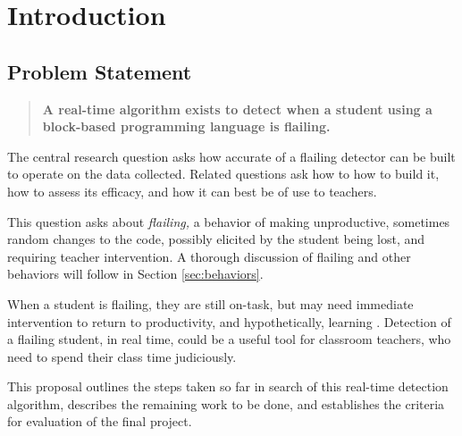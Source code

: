 \chapter{Introduction}

 
\section{Problem Statement} \label{sec:problem-statement}
\begin{quote}
\textbf{A real-time algorithm exists to detect when a student using a block-based programming language is flailing.}
\end{quote}

The central research question asks how accurate of a flailing detector can be built to operate on the data collected. Related questions ask how to how to build it, how to assess its efficacy, and how it can best be of use to teachers.

This question asks about \emph{flailing,} a behavior of making unproductive, sometimes random changes to the code, possibly elicited by the student being lost, and requiring teacher intervention. A thorough discussion of flailing and other behaviors will follow in Section \ref{sec:behaviors}.

When a student is flailing, they are still on-task, but may need immediate intervention to return to productivity, and hypothetically, learning \citep{baker2004off, perkins-1986}. Detection of a flailing student, in real time, could be a useful tool for classroom teachers, who need to spend their class time judiciously. 

This proposal outlines the steps taken so far in search of this real-time detection algorithm, describes the remaining work to be done, and establishes the criteria for evaluation of the final project.



